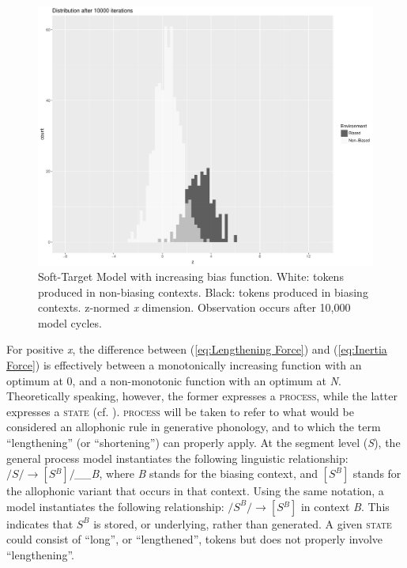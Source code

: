 \begin{figure}[H]
\centering{}\includegraphics[scale=0.3]{figures/BaselineModel10000iter.pdf}\caption{\label{fig:Model2:LengtheningProcess}Soft-Target Model with increasing
bias function. White: tokens produced
in non-biasing contexts. Black: tokens produced in biasing contexts.
z-normed \emph{x} dimension. Observation occurs after 10,000
model cycles.}
\end{figure}

For positive \emph{x}, the difference between (\ref{eq:Lengthening Force})
and (\ref{eq:Inertia Force}) is effectively between a monotonically
increasing function with an optimum at 0, and a non-monotonic function
with an optimum at \emph{N}. Theoretically speaking, however, the
former expresses a \textsc{process}, while the latter expresses a
\textsc{state} (cf. \citealt{Hyman1975}). \textsc{process }will be
taken to refer to what would be considered an allophonic rule in generative
phonology, and to which the term ``lengthening'' (or ``shortening'') can
properly apply. At the segment level (\emph{S}), the general process
model instantiates the following linguistic relationship: $/S/\rightarrow[S{}^{B}]/$\emph{\_\_B}\textsc{,
}where\emph{ B} stands for the biasing context, and $[S^{B}]$ stands
for the allophonic variant that occurs in that context. Using the
same notation, a  model instantiates the following relationship:
$/S^{B}/\rightarrow[S{}^{B}]$ in context \emph{B}. This indicates
that $S^{B}$ is stored, or underlying, rather than generated. A given
\textsc{state} could consist of ``long'', or ``lengthened'', tokens but
does not properly involve ``lengthening''. 

